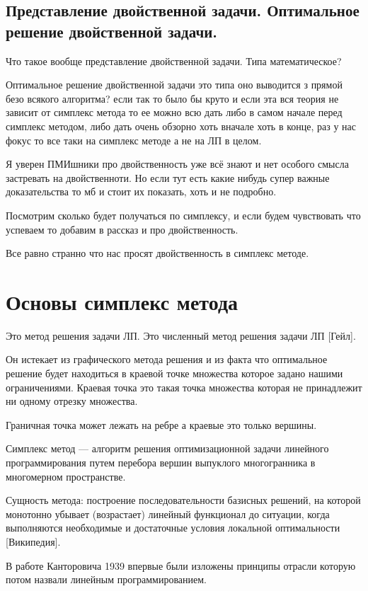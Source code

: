 \documentclass[a4paper,article,14pt]{extarticle}
\begin{document}
\subsection{Представление двойственной задачи. Оптимальное решение двойственной задачи.}

Что такое вообще представление двойственной задачи.
Типа математическое?

Оптимальное решение двойственной задачи это типа оно выводится з прямой безо всякого алгоритма?
если так то было бы круто и если эта вся теория не зависит от симплекс метода то ее можно всю дать либо в самом начале перед симплекс методом, либо дать очень обзорно хоть вначале хоть в конце, раз у нас фокус то все таки на симплекс методе а не на ЛП в целом.

Я уверен ПМИшники про двойственность уже всё знают и нет особого смысла застревать на двойственноти.
Но если тут есть какие нибудь супер важные доказательства то мб и стоит их показать, хоть и не подробно.

Посмотрим сколько будет получаться по симплексу, и если будем чувствовать что успеваем то добавим в рассказ и про двойственность.

Все равно странно что нас просят двойственность в симплекс методе.

\section{Основы симплекс метода}

Это метод решения задачи ЛП.
Это численный метод решения задачи ЛП [Гейл].

Он истекает из графического метода решения и из факта что оптимальное решение будет находиться в краевой точке множества которое задано нашими ограничениями.
Краевая точка это такая точка множества которая не принадлежит ни одному отрезку множества.

Граничная точка может лежать на ребре а краевые это только вершины.

Симплекс метод --- алгоритм решения оптимизационной задачи линейного программирования путем перебора вершин выпуклого многогранника в многомерном пространстве.

Сущность метода: построение последовательности базисных решений, на которой монотонно убывает (возрастает) линейный функционал до ситуации, когда выполняются необходимые и достаточные условия локальной оптимальности [Википедия].

В работе Канторовича 1939 впервые были изложены принципы отрасли которую потом назвали линейным программированием.
\end{document}

